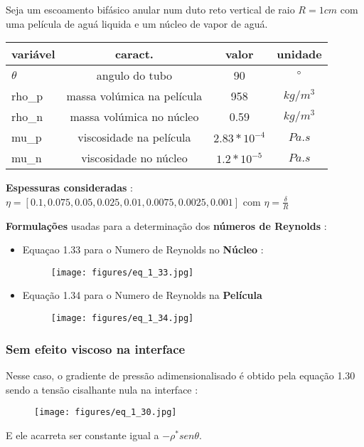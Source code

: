 \documentclass[a4paper, 11pt]{article}
\begin{document}
Seja um escoamento bifásico anular num duto reto vertical de raio $R=1cm$ com uma película de aguá liquida e um núcleo de vapor de aguá.

\begin{center}
\begin{tabular}{lccc}
	\hline
    variável & caract. & valor & unidade \\
    \hline
    $\theta$ & angulo do tubo & 90 & $\degree$ \\
    rho\_p & massa volúmica na película & 958 & $kg/m^3$ \\
    rho\_n & massa volúmica no núcleo & 0.59 & $kg/m^3$ \\
    mu\_p & viscosidade na película & $2.83*10^{-4}$ & $Pa.s$ \\
    mu\_n & viscosidade no núcleo & $1.2*10^{-5}$ & $Pa.s$ \\
    \hline
\end{tabular}
\end{center}

\bigskip
\textbf{Espessuras consideradas} :\\
$\eta=[0.1, 0.075, 0.05, 0.025, 0.01, 0.0075, 0.0025, 0.001]$ com $\eta = \frac{\delta}{R}$

\bigskip
\textbf{Formulações} usadas para a determinação dos \textbf{números de Reynolds} :
\begin{itemize}
\item Equaçao 1.33 para o Numero de Reynolds no \textbf{Núcleo} :
\begin{figure}[H]
  \begin{center}
  \texttt{[image: figures/eq\_1\_33.jpg]}  
\end{center} \end{figure}
\item Equação 1.34 para o Numero de Reynolds na \textbf{Película}
\begin{figure}[H]
  \begin{center}
  \texttt{[image: figures/eq\_1\_34.jpg]}  
\end{center} \end{figure}
\end{itemize}

\subsubsection{Sem efeito viscoso na interface}
Nesse caso, o gradiente de pressão adimensionalisado é obtido pela equação 1.30 sendo a tensão cisalhante nula na interface :
\begin{figure}[H]
  \begin{center}
  \texttt{[image: figures/eq\_1\_30.jpg]}  
\end{center} \end{figure}
E ele acarreta ser constante igual a $-\rho^*sen \theta$.
\end{document}
